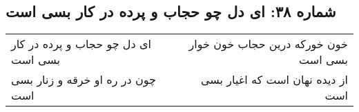 \begin{center}
\section*{شماره ۳۸: ای دل چو حجاب و پرده در کار بسی است}
\label{sec:038}
\begin{longtable}{l p{0.5cm} r}
ای دل چو حجاب و پرده در کار بسی است
&&
خون خورکه درین حجاب خون خوار بسی است
\\
چون در ره او خرقه و زنار بسی است
&&
از دیده نهان است که اغیار بسی است
\\
\end{longtable}
\end{center}
